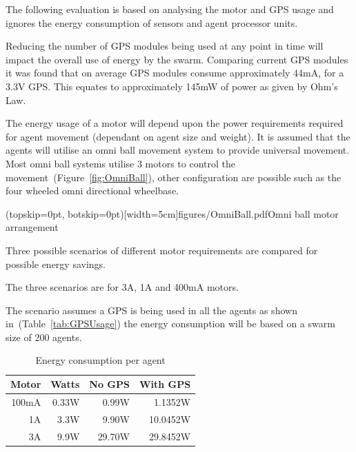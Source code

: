 \documentclass{ieeeaccess}
\begin{document}
The following evaluation is based on analysing the motor and GPS usage and ignores the energy consumption of sensors and agent processor units.

Reducing the number of GPS modules being used at any point in time will impact the overall use of energy by the swarm. Comparing current GPS modules it was found that on average GPS modules consume approximately 44mA, for a 3.3V GPS. This equates to approximately 145mW of power as given by Ohm's Law. 


The energy usage of a motor will depend upon the power requirements required for agent movement (dependant on agent size and weight). It is assumed that the agents will utilise an omni ball movement system to provide universal movement. Most omni ball systems utilise 3 motors to control the movement~(Figure~\ref{fig:OmniBall}), other configuration are possible such as the four wheeled omni directional wheelbase\cite{PD:06}.


\Figure[t!](topskip=0pt, botskip=0pt)[width=5cm]{figures/OmniBall.pdf}{Omni ball motor arrangement\label{fig:OmniBall}}

Three possible scenarios of different motor requirements are compared for possible energy savings.

The three scenarios are for 3A, 1A and 400mA motors.

The scenario assumes a GPS is being used in all the agents as shown in~(Table~\ref{tab:GPSUsage}) the energy consumption will be based on a swarm size of 200 agents.

\begin{table}
\begin{center}
\begin{tabular}{| r | r | r | r |}
\hline
Motor & Watts  & No GPS & With GPS \\ \hline
100mA &  0.33W &  0.99W & 1.1352W\\ \hline
1A    &  3.3W  &  9.90W & 10.0452W\\ \hline
3A    &  9.9W  & 29.70W & 29.8452W\\ \hline
\end{tabular}\caption{Energy consumption per agent} \label{tab:Energy1}
\end{center}
\end{table}
\end{document}
